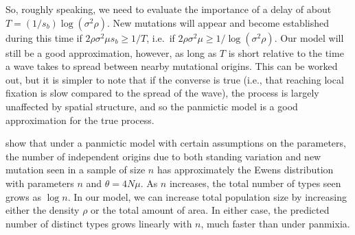 \documentclass{article}
\begin{document}
So, roughly speaking, we need to evaluate the importance of a delay of about $T = (1/s_b) \log (\sigma^2 \rho)$.
New mutations will appear and become established during this time if
$2 \rho \sigma^2 \mu s_b \ge 1/T$,
i.e.\ if $2 \rho \sigma^2 \mu \ge 1/\log (\sigma^2 \rho)$.
Our model will still be a good approximation, however, 
as long as $T$ is short relative to the time a wave takes to spread between nearby mutational origins.
This can be worked out,
but it is simpler to note that if the converse is true 
(i.e., that reaching local fixation is slow compared to the spread of the wave), 
the process is largely unaffected by spatial structure,
and so the panmictic model is a good approximation for the true process.


\citet{softsweepsII} show that under a panmictic model with certain assumptions on the parameters,
the number of independent origins due to both standing variation and new mutation seen in a sample of size $n$
has approximately the Ewens distribution with parameters $n$ and $\theta = 4 N \mu$.
As $n$ increases, the total number of types seen grows as $\log n$.
In our model, we can increase total population size by increasing either the density $\rho$ or the total amount of area.
In either case, the predicted number of distinct types grows linearly with $n$,
much faster than under panmixia.
\end{document}
